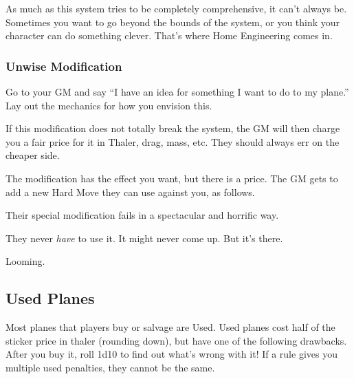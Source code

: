 \documentclass{article}
\begin{document}
As much as this system tries to be completely comprehensive, it can't
always be. Sometimes you want to go beyond the bounds of the system, or
you think your character can do something clever. That's where Home
Engineering comes in.

\subsubsection{Unwise Modification}
\label{_Unwise_Modification}

Go to your GM and say ``I have an idea for something I want to do to my
plane.'' Lay out the mechanics for how you envision this.

If this modification does not totally break the system, the GM will then
charge you a fair price for it in Thaler, drag, mass, etc. They should
always err on the cheaper side.

The modification has the effect you want, but there is a price. The GM
gets to add a new Hard Move they can use against you, as follows.

Their special modification fails in a spectacular and horrific
way.

They never \emph{have} to use it. It might never
come up. But it's there.

Looming.

\subsection{Used Planes}
\label{_Used_Planes}

Most planes that players buy or salvage are Used. Used planes cost half
of the sticker price in thaler (rounding down), but have one of the
following drawbacks. After you buy it, roll 1d10 to find out what's
wrong with it! If a rule gives you multiple used penalties, they cannot
be the same.
\end{document}
